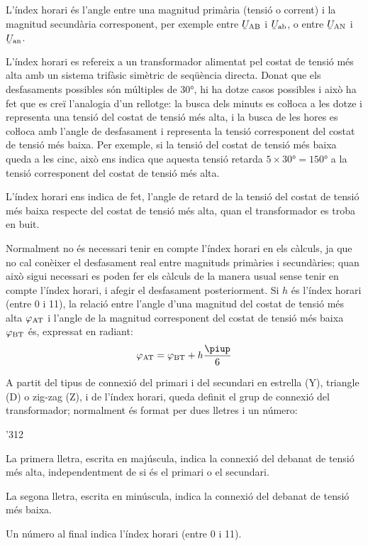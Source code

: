 L'índex horari és l'angle entre una magnitud  primària (tensió o corrent) i la magnitud secundària corresponent, per exemple entre $\cmplx{U}\ped{AB}$ i $\cmplx{U}\ped{ab}$, o entre $\cmplx{U}\ped{AN}$ i $\cmplx{U}\ped{an}$.

L'índex horari es refereix a un transformador alimentat pel costat de tensió més alta  amb un sistema trifàsic simètric de seqüència directa. Donat que els desfasaments possibles són múltiples de \ang{30}, hi ha dotze casos possibles i això ha fet que es creï l'analogia d'un rellotge: la busca dels minuts es coŀloca a les dotze i representa una tensió del costat de tensió més alta, i la busca de les hores es coŀloca amb l'angle de desfasament i representa la tensió corresponent del costat de tensió més baixa. Per exemple, si la tensió del costat de tensió més baixa queda a les cinc, això ens indica que aquesta tensió retarda $5\times \ang{30}= \ang{150}$ a la tensió corresponent del costat de tensió més alta.

L'índex horari ens indica de fet, l'angle de retard de la tensió del costat de tensió més baixa respecte del costat de tensió més alta, quan el transformador es troba en buit.

Normalment no és necessari tenir en compte l'índex horari en els càlculs, ja que no cal conèixer el desfasament real entre magnituds primàries i secundàries; quan això sigui necessari es poden fer els càlculs de la manera usual sense tenir en compte l'índex horari, i afegir el desfasament posteriorment. Si $h$ és l'índex horari (entre 0 i 11), la relació entre l'angle d'una magnitud del costat de tensió més alta $\varphi_\mathrm{AT}$ i l'angle de la magnitud corresponent del costat de tensió més baixa $\varphi_\mathrm{BT}$ és, expressat en radiant:
\begin{equation}
    \varphi\ped{AT} = \varphi\ped{BT} + h\frac{\piup}{6}\label{eq:fi-AT-BT}
\end{equation}


A partit del tipus de connexió del primari i del secundari en estrella (Y), triangle (D) o zig-zag (Z), i de l'índex horari, queda definit el grup de connexió del transformador; normalment és format per dues lletres i un número:
\begin{dingautolist}{'312}
   \item La primera lletra, escrita en majúscula, indica la connexió del debanat de tensió més alta, independentment de si és el primari o el secundari.
   \item La segona lletra, escrita en minúscula, indica la connexió del debanat de tensió més baixa.
   \item Un número al final indica l'índex horari (entre 0 i 11).
\end{dingautolist}

